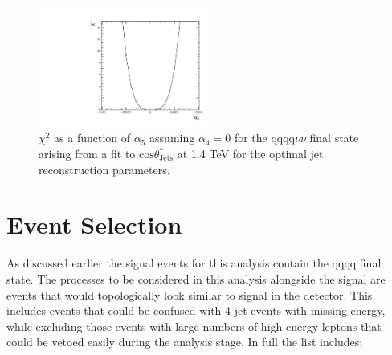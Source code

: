 \begin{figure}
\includegraphics[width=0.5\textwidth]{PhysicsAnalysis/Plots/Chi2ContoursOptimisation/1400GeV/KtSPFOsR0p90_alpha5.pdf}
\caption[$\chi^{2}$ as a function of $\alpha_{5}$ assuming $\alpha_{4} = 0$ for the $\text{qqqq}\nu\nu$ final state arising from a fit to $\text{cos}\theta^{*}_{\text{Jets}}$ at 1.4 TeV for the optimal jet reconstruction parameters.]{$\chi^{2}$ as a function of $\alpha_{5}$ assuming $\alpha_{4} = 0$ for the $\text{qqqq}\nu\nu$ final state arising from a fit to $\text{cos}\theta^{*}_{\text{Jets}}$ at 1.4 TeV for the optimal jet reconstruction parameters.}
\label{fig:a5chi2jetalgoideal1400GeV}
\end{figure}

\section{Event Selection}

As discussed earlier the signal events for this analysis contain the \nu{\nu}qqqq final state. The processes to be considered in this analysis alongside the signal are events that would topologically look similar to signal in the detector. This includes events that could be confused with 4 jet events with missing energy, while excluding those events with large numbers of high energy leptons that could be vetoed easily during the analysis stage. In full the list includes:

